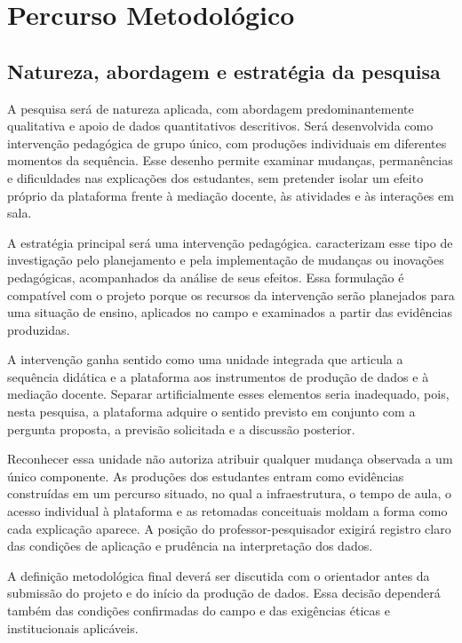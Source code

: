 \chapter{Percurso Metodológico}

\section{Natureza, abordagem e estratégia da pesquisa}

A pesquisa será de natureza aplicada, com abordagem predominantemente qualitativa e apoio de dados quantitativos descritivos. Será desenvolvida como intervenção pedagógica de grupo único, com produções individuais em diferentes momentos da sequência. Esse desenho permite examinar mudanças, permanências e dificuldades nas explicações dos estudantes, sem pretender isolar um efeito próprio da plataforma frente à mediação docente, às atividades e às interações em sala.

A estratégia principal será uma intervenção pedagógica.  caracterizam esse tipo de investigação pelo planejamento e pela implementação de mudanças ou inovações pedagógicas, acompanhados da análise de seus efeitos. Essa formulação é compatível com o projeto porque os recursos da intervenção serão planejados para uma situação de ensino, aplicados no campo e examinados a partir das evidências produzidas.

A intervenção ganha sentido como uma unidade integrada que articula a sequência didática e a plataforma aos instrumentos de produção de dados e à mediação docente. Separar artificialmente esses elementos seria inadequado, pois, nesta pesquisa, a plataforma adquire o sentido previsto em conjunto com a pergunta proposta, a previsão solicitada e a discussão posterior.

Reconhecer essa unidade não autoriza atribuir qualquer mudança observada a um único componente. As produções dos estudantes entram como evidências construídas em um percurso situado, no qual a infraestrutura, o tempo de aula, o acesso individual à plataforma e as retomadas conceituais moldam a forma como cada explicação aparece. A posição do professor-pesquisador exigirá registro claro das condições de aplicação e prudência na interpretação dos dados.

A definição metodológica final deverá ser discutida com o orientador antes da submissão do projeto e do início da produção de dados. Essa decisão dependerá também das condições confirmadas do campo e das exigências éticas e institucionais aplicáveis.

